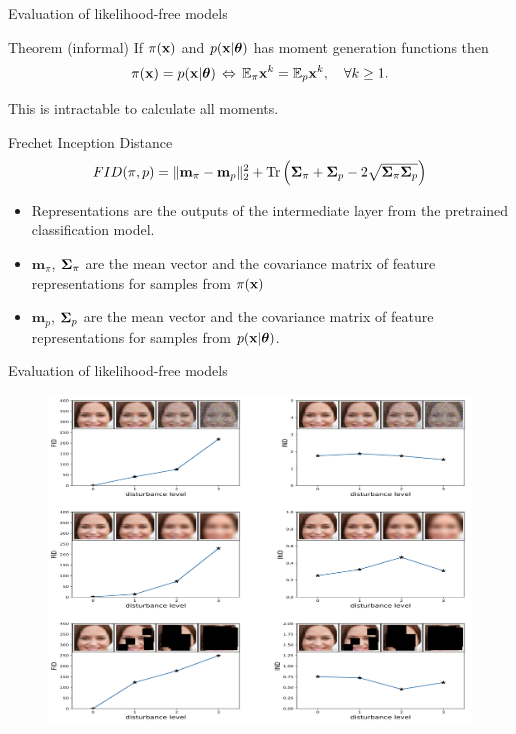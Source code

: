 \begin{frame}{Evaluation of likelihood-free models}
	\begin{block}{Theorem (informal)}
		If $\pi(\mathbf{x})$ and $p(\mathbf{x} | \boldsymbol{\theta})$ has moment generation functions then
		\vspace{-0.1cm}
		\[
			\pi(\mathbf{x}) = p(\mathbf{x} | \boldsymbol{\theta}) \, \Leftrightarrow \, \mathbb{E}_{\pi} \mathbf{x}^k = \mathbb{E}_{p} \mathbf{x}^k, \quad \forall k \geq 1.
		\]
		\vspace{-0.7cm}
	\end{block}
	This is intractable to calculate all moments.
	\begin{block}{Frechet Inception Distance}
		\vspace{-0.3cm}
		\[
			FID (\pi, p) = \| \mathbf{m}_{\pi} - \mathbf{m}_{p}\|_2^2 + \text{Tr} \left( \boldsymbol{\Sigma}_{\pi} + \boldsymbol{\Sigma}_p - 2 \sqrt{\boldsymbol{\Sigma}_{\pi} \boldsymbol{\Sigma}_p} \right)
		\]
		\vspace{-0.5cm}
	\end{block}
	\begin{itemize}
		\item Representations are the outputs of the intermediate layer from the pretrained classification model.
		\item $\mathbf{m}_{\pi}$, $\boldsymbol{\Sigma}_{\pi} $ are the mean vector and the covariance matrix of feature representations for samples from $\pi(\mathbf{x})$
		\item $\mathbf{m}_{p}$, $\boldsymbol{\Sigma}_p$ are the mean vector and the covariance matrix of feature representations for samples from $p(\mathbf{x} | \boldsymbol{\theta})$.
	\end{itemize} 

\end{frame}
\begin{frame}{Evaluation of likelihood-free models}
	\begin{figure}
		\centering
		\includegraphics[width=0.9\linewidth]{figs/fid_results}
	\end{figure}
\end{frame}
